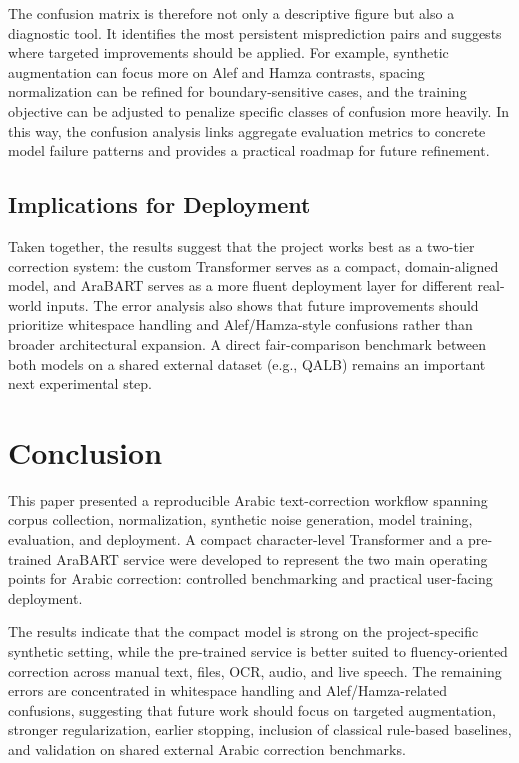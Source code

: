 \documentclass[conference]{IEEEtran}
\begin{document}
The confusion matrix is therefore not only a descriptive figure but also a diagnostic tool. It identifies the most persistent misprediction pairs and suggests where targeted improvements should be applied. For example, synthetic augmentation can focus more on Alef and Hamza contrasts, spacing normalization can be refined for boundary-sensitive cases, and the training objective can be adjusted to penalize specific classes of confusion more heavily. In this way, the confusion analysis links aggregate evaluation metrics to concrete model failure patterns and provides a practical roadmap for future refinement.

\subsection{Implications for Deployment}
Taken together, the results suggest that the project works best as a two-tier correction system: the custom Transformer serves as a compact, domain-aligned model, and AraBART serves as a more fluent deployment layer for different real-world inputs. The error analysis also shows that future improvements should prioritize whitespace handling and Alef/Hamza-style confusions rather than broader architectural expansion. A direct fair-comparison benchmark between both models on a shared external dataset (e.g., QALB) remains an important next experimental step.

\section{Conclusion}
This paper presented a reproducible Arabic text-correction workflow spanning corpus collection, normalization, synthetic noise generation, model training, evaluation, and deployment. A compact character-level Transformer and a pre-trained AraBART service were developed to represent the two main operating points for Arabic correction: controlled benchmarking and practical user-facing deployment.

The results indicate that the compact model is strong on the project-specific synthetic setting, while the pre-trained service is better suited to fluency-oriented correction across manual text, files, OCR, audio, and live speech. The remaining errors are concentrated in whitespace handling and Alef/Hamza-related confusions, suggesting that future work should focus on targeted augmentation, stronger regularization, earlier stopping, inclusion of classical rule-based baselines, and validation on shared external Arabic correction benchmarks.



\end{document}
